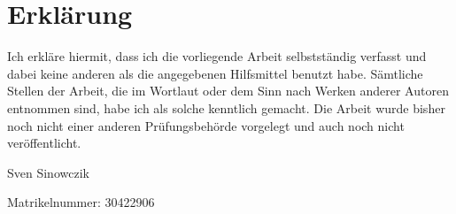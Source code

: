 \section*{Erklärung}

Ich erkläre hiermit, dass ich die vorliegende Arbeit selbstständig verfasst und dabei keine anderen als die angegebenen Hilfsmittel benutzt habe. Sämtliche Stellen der Arbeit, die im Wortlaut oder dem Sinn nach Werken anderer Autoren entnommen sind, habe ich als solche kenntlich gemacht. Die Arbeit wurde bisher  noch nicht einer anderen Prüfungsbehörde vorgelegt und auch noch nicht veröffentlicht.

\bigskip
\noindent
\datum

\vspace{25mm}

\noindent


\vspace{25mm}

Sven Sinowczik

Matrikelnummer: 30422906